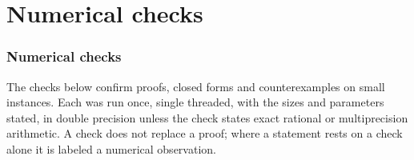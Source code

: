 \documentclass[11pt]{article}
\begin{document}
\part{Numerical checks}\label{sup:part-checks}

\section{Numerical checks}\label{app:checks}
The checks below confirm proofs, closed forms and counterexamples on small instances. Each was run once, single threaded, with the sizes and parameters stated, in double precision unless the check states exact rational or multiprecision arithmetic. A check does not replace a proof; where a statement rests on a check alone it is labeled a numerical observation.

























\end{document}
